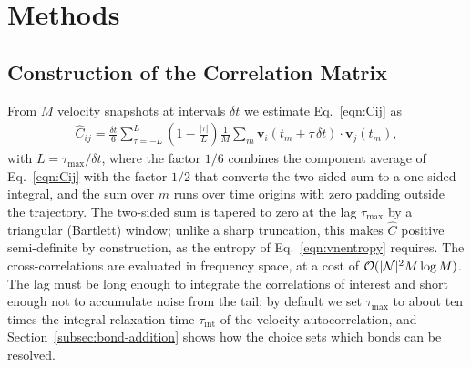 \section{Methods}
\label{sec:methods}

\subsection{Construction of the Correlation Matrix}
\label{subsec:matrix-computation}
From $M$ velocity snapshots at intervals $\delta t$ we estimate Eq.~\eqref{eqn:Cij} as
\begin{align}
    \hat{C}_{ij} = \frac{\delta t}{6} \sum\limits_{\tau = -L}^{L} \left(1 - \frac{|\tau|}{L}\right) \frac{1}{M} \sum\limits_{m} \mathbf{v}_{i}(t_{m} + \tau\, \delta t) \cdot \mathbf{v}_{j}(t_{m}),
    \label{eqn:Chat}
\end{align}
with $L = \tau_{\max}/\delta t$,
where the factor $1/6$ combines the component average of Eq.~\eqref{eqn:Cij} with the factor $1/2$ that converts the two-sided sum to a one-sided integral, and the sum over $m$ runs over time origins with zero padding outside the trajectory.
The two-sided sum is tapered to zero at the lag $\tau_{\max}$ by a triangular (Bartlett) window; unlike a sharp truncation, this makes $\hat{C}$ positive semi-definite by construction, as the entropy of Eq.~\eqref{eqn:vnentropy} requires.
The cross-correlations are evaluated in frequency space, at a cost of $\mathcal{O}(|\mathcal{N}|^{2} M \log M)$.
The lag must be long enough to integrate the correlations of interest and short enough not to accumulate noise from the tail; by default we set $\tau_{\max}$ to about ten times the integral relaxation time $\tau_{\text{int}}$ of the velocity autocorrelation, and Section~\ref{subsec:bond-addition} shows how the choice sets which bonds can be resolved.

